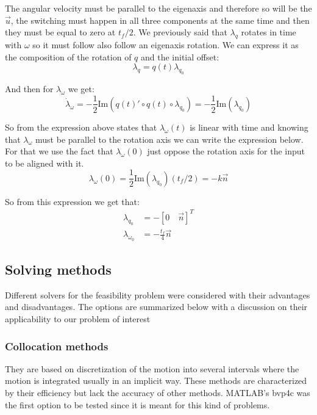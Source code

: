 The angular velocity must be parallel to the eigenaxis and therefore so will be the $\vec{u}$, the switching must happen in all three components at the same time and then they must be equal to zero at $t_f/2$. We previously said that $\lambda_q$ rotates in time with $\omega$ so it must follow also follow an eigenaxis rotation. We can express it as the composition of the rotation of $q$ and the initial offset:
\begin{equation}
\lambda_q = q(t) \lambda_{q_0}
\end{equation}

And then for $\lambda_\omega$ we get:
\begin{equation}
\dot{\lambda}_\omega = -\frac{1}{2} \text{Im}(q(t)' \circ q(t) \circ \lambda_{q_0}) = -\frac{1}{2} \text{Im}(\lambda_{q_0})
\end{equation}

So from the expression above states that $\lambda_{\omega}(t)$ is linear with time and knowing that $\lambda_{\omega}$ must be parallel to the rotation axis we can write the expression below. For that we use the fact that $\lambda_{\omega}(0)$ just oppose the rotation axis for the input to be aligned with it.
\begin{equation*}
\lambda_{\omega}(0) = \frac{1}{2} \text{Im}(\lambda_{q_0}) (t_f/2) = - k \vec{n}
\end{equation*}

So from this expression we get that:
\begin{align}
\lambda_{q_0} &= - [0 \quad \vec{n}]^T\\
\lambda_{\omega_0} &= -\frac{t_f}{4} \vec{n}
\end{align}

\subsection{Solving methods}
Different solvers for the feasibility problem were considered with their advantages and disadvantages. The options are summarized below with a discussion on their applicability to our problem of interest

\subsubsection{Collocation methods} 
They are based on discretization of the motion into several intervals where the motion is integrated usually in an implicit way. These methods are characterized by their efficiency but lack the accuracy of other methods. MATLAB's bvp4c was the first option to be tested since it is meant for this kind of problems. 

